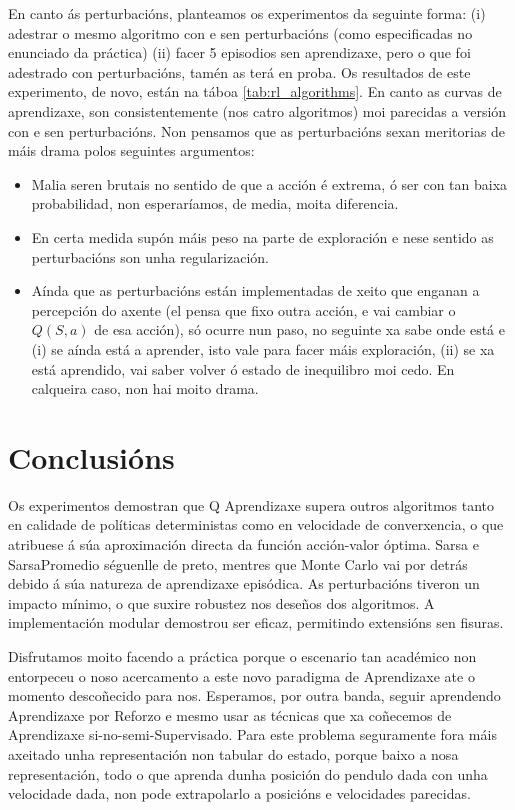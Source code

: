 \documentclass{article}
\begin{document}
En canto ás perturbacións, planteamos os experimentos da seguinte forma: (i) adestrar o mesmo algoritmo con e sen perturbacións (como especificadas no enunciado da práctica) (ii) facer 5 episodios sen aprendizaxe, pero o que foi adestrado con perturbacións, tamén as terá en proba. Os resultados de este experimento, de novo, están na táboa \ref{tab:rl_algorithms}. En canto as curvas de aprendizaxe, son consistentemente (nos catro algoritmos) moi parecidas a versión con e sen perturbacións. Non pensamos que as perturbacións sexan meritorias de máis drama polos seguintes argumentos:
\begin{itemize}
	\item Malia seren brutais no sentido de que a acción é extrema, ó ser con tan baixa probabilidad, non esperaríamos, de media, moita diferencia.
	\item En certa medida supón máis peso na parte de exploración e nese sentido as perturbacións son unha regularización.
	\item Aínda que as perturbacións están implementadas de xeito que enganan a percepción do axente (el pensa que fixo outra acción, e vai cambiar o $Q(S,a)$ de esa acción), só ocurre nun paso, no seguinte xa sabe onde está e (i) se aínda está a aprender, isto vale para facer máis exploración, (ii) se xa está aprendido, vai saber volver ó estado de inequilibro moi cedo. En calqueira caso, non hai moito drama. 

\end{itemize}

\section{Conclusións}

Os experimentos demostran que Q Aprendizaxe supera outros algoritmos tanto en calidade de políticas deterministas como en velocidade de converxencia, o que atribuese á súa aproximación directa da función acción-valor óptima. Sarsa e SarsaPromedio séguenlle de preto, mentres que Monte Carlo vai por detrás debido á súa natureza de aprendizaxe episódica. As perturbacións tiveron un impacto mínimo, o que suxire robustez nos deseños dos algoritmos. A implementación modular demostrou ser eficaz, permitindo extensións sen fisuras. 

Disfrutamos moito facendo a práctica porque o escenario tan académico non entorpeceu o noso acercamento a este novo paradigma de Aprendizaxe ate o momento descoñecido para nos. Esperamos, por outra banda, seguir aprendendo Aprendizaxe por Reforzo e mesmo usar as técnicas que xa coñecemos de Aprendizaxe si-no-semi-Supervisado. Para este problema seguramente fora máis axeitado unha representación non tabular do estado, porque baixo a nosa representación, todo o que aprenda dunha posición do pendulo dada con unha velocidade dada, non pode extrapolarlo a posicións e velocidades parecidas. 
\end{document}
